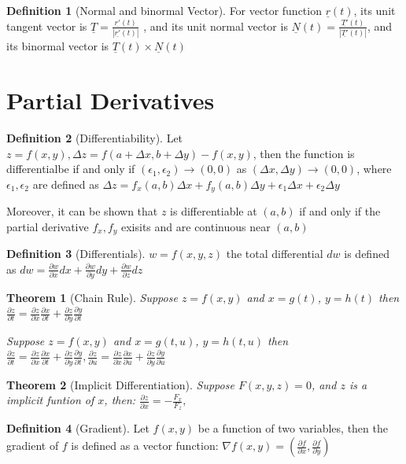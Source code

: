 \documentclass[9pt]{article}
\newtheorem{theorem}{Theorem}[subsection]
\theoremstyle{definition}
\newtheorem{definition}{Definition}[section]
\theoremstyle{remark}
\begin{document}
\begin{definition}[Normal and binormal Vector]
	For vector function $ \underline{r}(t) $, its unit tangent vector is $ \underline{T} = \frac{ \underline{r'}(t)}{| \underline{r'}(t)|} $
	, and its unit normal vector is $ \underline{N}(t) = \frac{ \underline{T'}(t)}{| \underline{T'}(t)|}$, and its binormal vector is $ \underline{T}(t) \times \underline{N}(t) $
\end{definition}
\section{Partial Derivatives}

\begin{definition}[Differentiability]
	Let $z = f(x,y), \Delta z = f(a+\Delta x,b+\Delta y) - f(x,y) $, then the function is differentialbe if and only if $(\epsilon _1, \epsilon _2) \to (0, 0)$ as  $(\Delta x, \Delta y) \to (0, 0)$, where $ \epsilon _1, \epsilon _2 $ are defined as 
$	
\Delta z = f_x(a,b) \Delta x + f_y(a,b) \Delta y + \epsilon _1 \Delta x + \epsilon _2 \Delta y
$

Moreover, it can be shown that $z$ is differentiable at $(a,b)$ if and only if the partial derivative $f_x, f_y$ exisits and are continuous near $(a,b)$
\end{definition}

\begin{definition}[Differentials]
	$w = f(x,y,z)$ the total differential $dw$ is defined as 
	$
dw = \frac{\partial w}{\partial x} dx + \frac{\partial w}{\partial y} dy + \frac{\partial w}{\partial z} d z
	$
	
\end{definition}
\begin{theorem}[Chain Rule]
Suppose $z = f(x, y)$ and $ x = g(t)$, $y = h(t)$ then 
$
\frac{\partial z}{\partial t} = \frac{\partial z}{\partial x} \frac{\partial x}{\partial t} + \frac{\partial z}{\partial y} \frac{\partial y}{\partial t}
$

Suppose $z = f(x, y)$ and $ x = g(t, u)$, $y = h(t, u)$ then
$
\frac{\partial z}{\partial t} = \frac{\partial z}{\partial x} \frac{\partial x}{\partial t} + \frac{\partial z}{\partial y} \frac{\partial y}{\partial t}, 
\frac{\partial z}{\partial u}
= \frac{\partial z}{\partial x} \frac{\partial x}{\partial u} + \frac{\partial z}{\partial y} \frac{\partial y}{\partial u}
$

\end{theorem}

\begin{theorem}[Implicit Differentiation]
	Suppose $F(x,y,z) = 0$, and $z$ is a implicit funtion of $x$, then:
$	
		\frac{\partial z}{\partial x} = - \frac{F_x}{F_z}, 
$
\end{theorem}
\begin{definition}[Gradient]
	Let $f(x,y)$ be a function of two variables, then the gradient of $f$ is defined as a vector function: 
	$
\nabla f(x,y) = \left( \frac{\partial f}{\partial x}, \frac{\partial f}{\partial y} \right)
	$
\end{definition}
\end{document}
